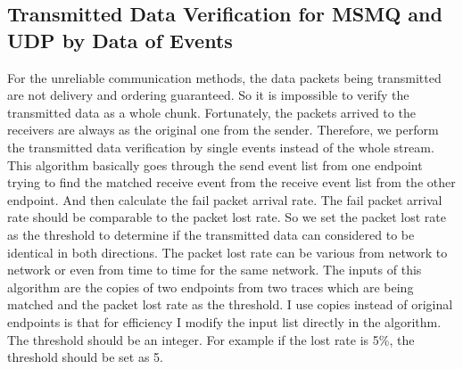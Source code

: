 \subsection{Transmitted Data Verification for MSMQ and UDP by Data of Events}
For the unreliable communication methods, the data packets being transmitted are not delivery and ordering guaranteed. So it is impossible to verify the transmitted data as a whole chunk. Fortunately, the packets arrived to the receivers are always as the original one from the sender. Therefore, we perform the transmitted data verification by single events instead of the whole stream. This algorithm basically goes through the send event list from one endpoint trying to find the matched receive event from the receive event list from the other endpoint. And then calculate the fail packet arrival rate. The fail packet arrival rate should be comparable to the packet lost rate. So we set the packet lost rate as the threshold to determine if the transmitted data can considered to be identical in both directions. The packet lost rate can be various from network to network or even from time to time for the same network. The inputs of this algorithm are the copies of two endpoints from two traces which are being matched and the packet lost rate as the threshold. I use copies instead of original endpoints is that for efficiency I modify the input list directly in the algorithm. The threshold should be an integer. For example if the lost rate is 5\%, the threshold should be set as 5. 
